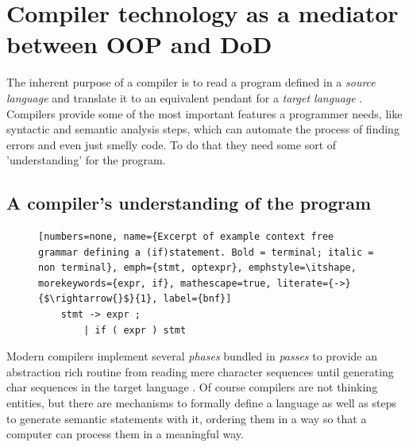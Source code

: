 \chapter{Compiler technology as a mediator between OOP and DoD}
The inherent purpose of a compiler is to read a program defined in a \textit{source language} and translate it to an equivalent pendant for a \textit{target language} .\\
Compilers provide some of the most important features a programmer needs, like syntactic and semantic analysis steps, which can automate the process of finding errors and even just smelly code. To do that they need some sort of 'understanding' for the program.

\section{A compiler's understanding of the program}\label{compilers_understanding}
\begin{figure}
\vspace{-0.8cm}
	\begin{lstlisting}[numbers=none, name={Excerpt of example context free grammar defining a (if)statement. Bold = terminal; italic = non terminal}, emph={stmt, optexpr}, emphstyle=\itshape, morekeywords={expr, if}, mathescape=true, literate={->}{$\rightarrow{}$}{1}, label={bnf}]
	stmt -> expr ;
		| if ( expr ) stmt
	\end{lstlisting}
\end{figure}
Modern compilers implement several \textit{phases} bundled in \textit{passes} to provide an abstraction rich routine from reading mere character sequences until generating char sequences in the target language . Of course compilers are not thinking entities, but there are mechanisms to formally define a language as well as steps to generate semantic statements with it, ordering them in a way so that a computer can process them in a meaningful way.
